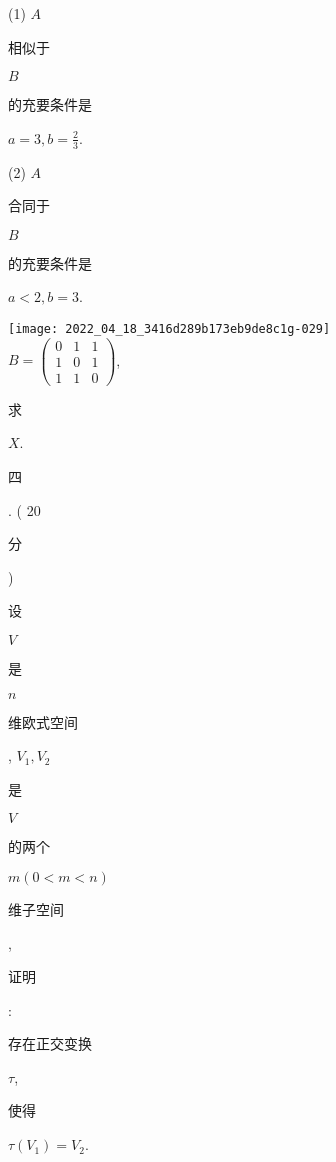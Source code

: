 \documentclass[10pt]{article}
\begin{document}
(1) $A$ \begin{CJK}{UTF8}{mj}相似于\end{CJK} $B$ \begin{CJK}{UTF8}{mj}的充要条件是\end{CJK} $a=3, b=\frac{2}{3}$.

(2) $A$ \begin{CJK}{UTF8}{mj}合同于\end{CJK} $B$ \begin{CJK}{UTF8}{mj}的充要条件是\end{CJK} $a<2, b=3$.

\texttt{[image: 2022\_04\_18\_3416d289b173eb9de8c1g-029]}\\
$B=\left(\begin{array}{ccc}0 & 1 & 1 \\ 1 & 0 & 1 \\ 1 & 1 & 0\end{array}\right)$, \begin{CJK}{UTF8}{mj}求\end{CJK} $X$.

\begin{CJK}{UTF8}{mj}四\end{CJK}. ( 20 \begin{CJK}{UTF8}{mj}分\end{CJK}) \begin{CJK}{UTF8}{mj}设\end{CJK} $V$ \begin{CJK}{UTF8}{mj}是\end{CJK} $n$ \begin{CJK}{UTF8}{mj}维欧式空间\end{CJK}, $V_{1}, V_{2}$ \begin{CJK}{UTF8}{mj}是\end{CJK} $V$ \begin{CJK}{UTF8}{mj}的两个\end{CJK} $m(0<m<n)$ \begin{CJK}{UTF8}{mj}维子空间\end{CJK}, \begin{CJK}{UTF8}{mj}证明\end{CJK}: \begin{CJK}{UTF8}{mj}存在正交变换\end{CJK} $\tau$, \begin{CJK}{UTF8}{mj}使得\end{CJK} $\tau\left(V_{1}\right)=V_{2}$.
\end{document}
